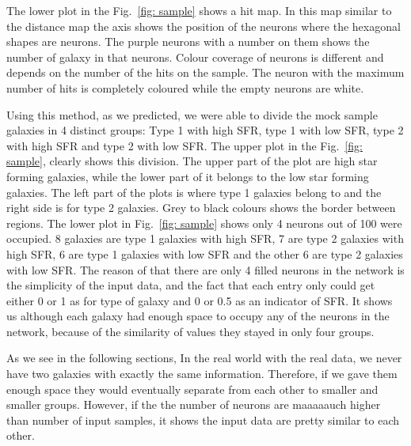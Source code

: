  The lower plot in the Fig.~\ref{fig: sample} shows a hit map.
 In this map similar to the distance map the axis shows the position of the neurons where the hexagonal shapes are neurons.
 The purple neurons with a number on them shows the number of galaxy in that neurons.
 Colour coverage of neurons is different and depends on the number of the hits on the sample.
 The neuron with the maximum number of hits is completely coloured while the empty neurons are white.

Using this method, as we predicted, we were able to divide the mock sample galaxies in 4 distinct groups: Type 1 with high SFR, type 1 with low SFR, type 2 with high SFR and type 2 with low SFR. 
The upper plot in the Fig.~\ref{fig: sample}, clearly shows this division.
The upper part of the plot are high star forming galaxies, while the lower part of it belongs to the low star forming galaxies.
The left part of the plots is where type 1 galaxies belong to and the right side is for type 2 galaxies.
Grey to black colours shows the border between regions.
The lower plot in Fig.~\ref{fig: sample} shows only 4 neurons out of 100 were occupied. 
8 galaxies are type 1 galaxies with high SFR, 7 are type 2 galaxies with high SFR, 6 are type 1 galaxies with low SFR and the other 6 are type 2 galaxies with low SFR. 
The reason of that there are only 4 filled neurons in the network is the simplicity of the input data, and the fact that each entry only could get either 0 or 1 as for type of galaxy and 0 or 0.5 as an indicator of SFR.
It shows us although each galaxy had enough space to occupy any of the neurons in the network, because of the similarity of values they stayed in only four groups. 

As we see in the following sections, In the real world with the real data, we never have two galaxies with exactly the same information.
Therefore, if we gave them enough space they would eventually separate from each other to smaller and smaller groups. 
However, if the  the number of neurons are maaaaauch higher than number of input samples, it shows the input data are pretty similar to each other.


